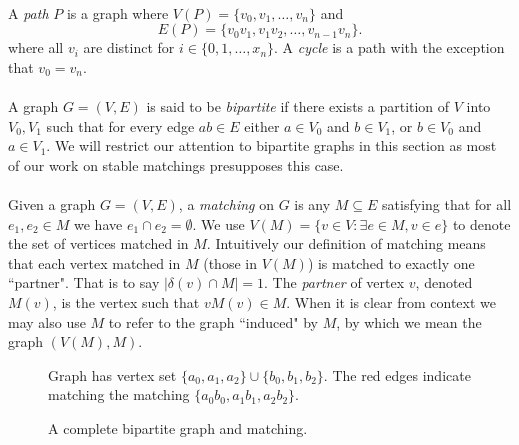 \paragraph{}
A {\it path} $P$ is a graph where  $V(P) = \{v_0, v_1, \dots, v_n\}$ and 
$$E(P) = \{v_0v_1, v_1v_2, \dots, v_{n-1}v_n\}.$$
where all $v_i$ are distinct for $i \in \{0,1,\dots,x_n\}$. A {\it cycle} is a path with the exception that $v_0 = v_n$.

\paragraph{} A graph $G = (V,E)$ is said to be {\it bipartite} if there exists a partition of $V$ into $V_0, V_1$ such that for every edge $ab \in E$ either $a \in V_0$ and $b \in V_1$, or $b \in V_0$ and $a \in V_1$. We will restrict our attention to bipartite graphs in this section as most of our work on stable matchings presupposes this case.

\paragraph{} Given a graph $G = (V,E)$, a {\it matching} on $G$ is any $M \subseteq E$ satisfying that for all $e_1, e_2 \in M$ we have $e_1 \cap e_2 = \emptyset$. We use $V(M) = \{v \in V: \exists e \in M, v \in e\}$ to denote the set of vertices matched in $M$. Intuitively our definition of matching means that each vertex matched in $M$ (those in $V(M)$) is matched to exactly one ``partner". That is to say $|\delta(v) \cap M| = 1$. The {\it partner} of vertex $v$, denoted $M(v)$, is the vertex such that $vM(v) \in M$. When it is clear from context we may also use $M$ to refer to the graph ``induced" by $M$, by which we mean the graph $(V(M), M)$.

\begin{figure}[h]
\centering
{}
\caption{A complete bipartite graph and matching.}
\small
\begin{flushleft}
 Graph has vertex set $\{a_0,a_1, a_2\} \cup \{b_0,b_1,b_2\}$. The red edges indicate matching the matching $\{a_0b_0, a_1b_1, a_2b_2\}$.
\end{flushleft}
\end{figure}
